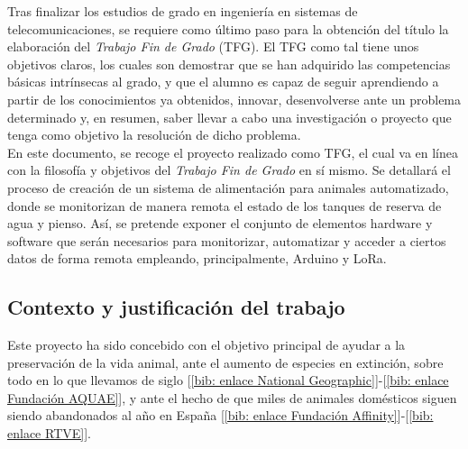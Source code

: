 \documentclass[12pt]{article}
\begin{document}
	Tras finalizar los estudios de grado en ingeniería en sistemas de telecomunicaciones, se requiere como último paso para la obtención del título la elaboración del \textit{Trabajo Fin de Grado} (TFG). 
	El TFG como tal tiene unos objetivos claros, los cuales son demostrar que se han adquirido las competencias básicas intrínsecas al grado, y que el alumno es capaz de seguir aprendiendo a partir de los conocimientos ya obtenidos, innovar, desenvolverse ante un problema determinado y, en resumen, saber llevar a cabo una investigación o proyecto que tenga como objetivo la resolución de dicho problema. \\
	
	\noindent En este documento, se recoge el proyecto realizado como TFG,  el cual va en línea con la filosofía y objetivos del \textit{Trabajo Fin de Grado} en sí mismo. Se detallará el proceso de creación de un sistema de alimentación para animales automatizado, donde se monitorizan de manera remota el estado de los tanques de reserva de agua y pienso. Así, se pretende exponer el conjunto de elementos hardware y software que serán necesarios para monitorizar, automatizar y acceder a ciertos datos de forma remota empleando, principalmente, Arduino y LoRa.\\
	
	
	\subsection[Contexto y justificación del trabajo]{Contexto y justificación del trabajo}

	\noindent Este proyecto ha sido concebido con el objetivo principal de ayudar a la preservación de la vida animal, ante el aumento de especies en extinción, sobre todo en lo que llevamos de siglo [\ref{bib: enlace National Geographic}]-[\ref{bib: enlace Fundación AQUAE}], 
	y ante el hecho de que miles de animales domésticos siguen siendo abandonados al año en España [\ref{bib: enlace Fundación Affinity}]-[\ref{bib: enlace RTVE}]. \\ %
	
\end{document}
